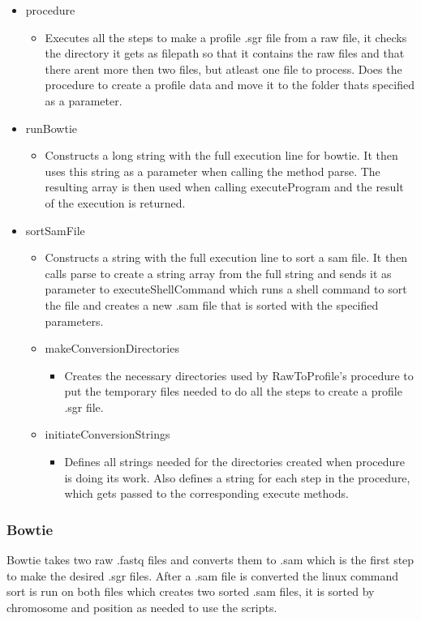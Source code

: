 \begin{itemize} 
\item procedure
\begin{itemize}
\item Executes all the steps to make a profile .sgr file from a raw file, it checks the directory it gets as filepath so that it contains the raw files and that there arent more then two files, but atleast one file to process. Does the procedure to create a profile data and move it to the folder thats specified as a parameter.
\end{itemize}

\item runBowtie
\begin{itemize}
\item Constructs a long string with the full execution line for bowtie. It then uses this string as a parameter when calling the method parse. 
The resulting array is then used when calling executeProgram and the result of the execution is returned.
\end{itemize}
\item sortSamFile
\begin{itemize}
\item Constructs a string with the full execution line to sort a sam file. It then calls parse to create a string array from the full string and sends it as parameter to executeShellCommand which runs a shell command to sort the file and creates a new .sam file that is sorted with the specified parameters.
\item makeConversionDirectories
\begin{itemize}
\item Creates the necessary directories used by RawToProfile's procedure to put the temporary files needed to do all the steps to create a profile .sgr file.
\end{itemize}
\item initiateConversionStrings
\begin{itemize}
\item Defines all strings needed for the directories created when procedure is doing its work. Also defines a string for each step in the procedure, which gets passed to the corresponding execute methods. 
\end{itemize}
\end{itemize}
\end{itemize}

\subsubsection{Bowtie}
Bowtie takes two raw .fastq files and converts them to .sam which is the first step to make the desired .sgr files. After a .sam file is converted the linux command sort is run  on both files which creates two sorted .sam files, it is sorted by chromosome and position as needed to use the scripts.
